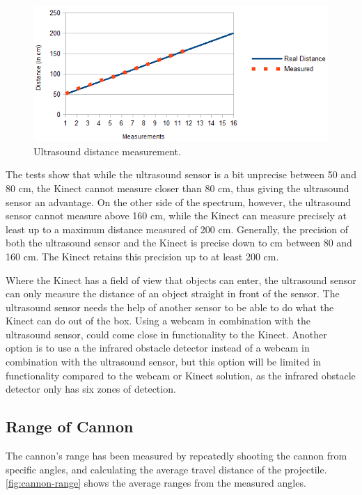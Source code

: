 \begin{figure}[hbtp]
\includegraphics[width=\textwidth]{img/ultrasound-distance.png}
\caption{Ultrasound distance measurement.} 
\label{fig:ultrasound-distance} 
\end{figure}

The tests show that while the ultrasound sensor is a bit unprecise between 50 and 80 cm, the Kinect cannot measure closer than 80 cm, thus giving the ultrasound sensor an advantage.
On the other side of the spectrum, however, the ultrasound sensor cannot measure above 160 cm, while the Kinect can measure precisely at least up to a maximum distance measured of 200 cm.
Generally, the precision of both the ultrasound sensor and the Kinect is precise down to  cm between 80 and 160 cm. The Kinect retains this precision up to at least 200 cm.

Where the Kinect has a field of view that objects can enter, the ultrasound sensor can only measure the distance of an object straight in front of the sensor. The ultrasound sensor needs the help of another sensor to be able to do what the Kinect can do out of the box. Using a webcam in combination with the ultrasound sensor, could come close in functionality to the Kinect. Another option is to use a the infrared obstacle detector instead of a webcam in combination with the ultrasound sensor, but this option will be limited in functionality compared to the webcam or Kinect solution, as the infrared obstacle detector only has six zones of detection.

\subsection{Range of Cannon}
\label{cannonrange}
The cannon's range has been measured by repeatedly shooting the cannon from specific angles, and calculating the average travel distance of the projectile. \autoref{fig:cannon-range} shows the average ranges from the measured angles.


